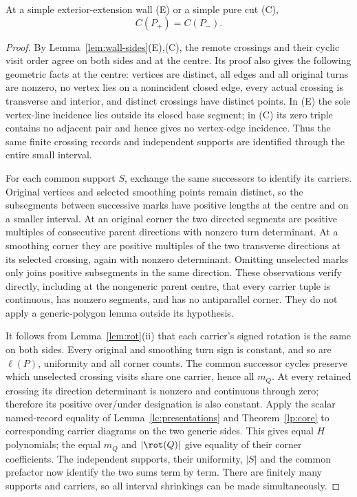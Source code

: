 \begin{proposition}[silence]\label{prop:C-silent}\leanok
At a simple exterior-extension wall (E) or a simple pure cut (C),
\begin{equation}\label{ccf:silence}
C(P_+)=C(P_-).
\end{equation}

\end{proposition}
\begin{proof}\leanok{}
By Lemma~\ref{lem:wall-sides}(E),(C), the remote crossings and their
cyclic visit order agree on both sides and at the centre. Its proof also
gives the following geometric facts at the centre: vertices are distinct,
all edges and all original turns are nonzero, no vertex lies on a
nonincident closed edge, every actual crossing is transverse and interior,
and distinct crossings have distinct points. In (E) the sole vertex-line
incidence lies outside its closed base segment; in (C) its zero triple
contains no adjacent pair and hence gives no vertex-edge incidence.
Thus the same finite crossing records and independent supports are
identified through the entire small interval.

For each common support $S$, exchange the same successors to identify its
carriers. Original vertices and selected smoothing points remain distinct,
so the subsegments between successive marks have positive lengths at the
centre and on a smaller interval. At an original corner the two directed
segments are positive multiples of consecutive parent directions with
nonzero turn determinant. At a smoothing corner they are positive
multiples of the two transverse directions at its selected crossing,
again with nonzero determinant. Omitting unselected marks only joins
positive subsegments in the same direction. These observations verify
directly, including at the nongeneric parent centre, that every carrier
tuple is continuous, has nonzero segments, and has no antiparallel corner.
They do not apply a generic-polygon lemma outside its hypothesis.

It follows from Lemma~\ref{lem:rot}(ii) that each carrier's signed rotation
is the same on both sides. Every original and smoothing turn sign is
constant, and so are $\ell(P)$, uniformity and all corner counts. The
common successor cycles preserve which unselected crossing visits share
one carrier, hence all $m_Q$. At every retained crossing its direction
determinant is nonzero and continuous through zero; therefore its positive
over/under designation is also constant. Apply the scalar named-record equality of
Lemma~\ref{lc:presentations} and Theorem~\ref{lp:core} to corresponding
carrier diagrams on the two generic sides. This gives equal $H$ polynomials;
the equal $m_Q$ and $|\rot(Q)|$ give equality of their corner coefficients.
The independent supports, their uniformity, $|S|$ and the common prefactor
now identify the two sums term by term. There are finitely many supports
and carriers, so all interval shrinkings can be made simultaneously.


\end{proof}
